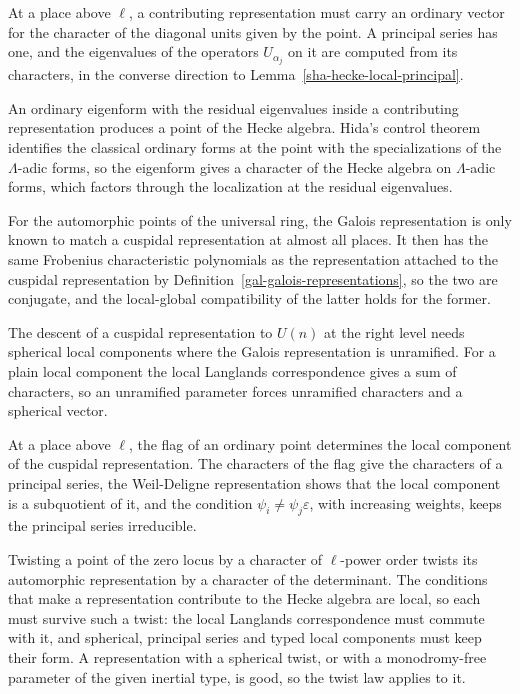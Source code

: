At a place above $\ell$, a contributing representation must carry an ordinary vector for the character of the diagonal units given by the point. A principal series has one, and the eigenvalues of the operators $U_{\alpha_j}$ on it are computed from its characters, in the converse direction to Lemma~\ref{sha-hecke-local-principal}.

An ordinary eigenform with the residual eigenvalues inside a contributing representation produces a point of the Hecke algebra. Hida's control theorem identifies the classical ordinary forms at the point with the specializations of the $\Lambda$-adic forms, so the eigenform gives a character of the Hecke algebra on $\Lambda$-adic forms, which factors through the localization at the residual eigenvalues.

For the automorphic points of the universal ring, the Galois representation is only known to match a cuspidal representation at almost all places. It then has the same Frobenius characteristic polynomials as the representation attached to the cuspidal representation by Definition~\ref{gal-galois-representations}, so the two are conjugate, and the local-global compatibility of the latter holds for the former.

The descent of a cuspidal representation to $U(n)$ at the right level needs spherical local components where the Galois representation is unramified. For a plain local component the local Langlands correspondence gives a sum of characters, so an unramified parameter forces unramified characters and a spherical vector.

At a place above $\ell$, the flag of an ordinary point determines the local component of the cuspidal representation. The characters of the flag give the characters of a principal series, the Weil-Deligne representation shows that the local component is a subquotient of it, and the condition $\psi_i\ne\psi_j\varepsilon$, with increasing weights, keeps the principal series irreducible.

Twisting a point of the zero locus by a character of $\ell$-power order twists its automorphic representation by a character of the determinant. The conditions that make a representation contribute to the Hecke algebra are local, so each must survive such a twist: the local Langlands correspondence must commute with it, and spherical, principal series and typed local components must keep their form. A representation with a spherical twist, or with a monodromy-free parameter of the given inertial type, is good, so the twist law applies to it.

